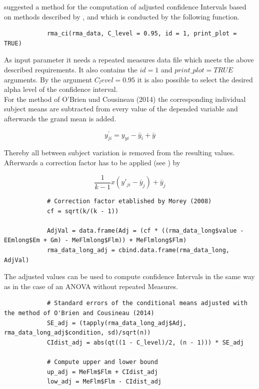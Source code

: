 \documentclass[11pt]{article}
\begin{document}
		\cite{o2014representing} suggested a method for the computation of adjusted confidence Intervals based on methods described by \cite{loftus1994using}, \cite{cousineau2005confidence} and \cite{morey2008confidence} which is conducted by the following function.\\
		
		\begin{lstlisting}
			rma_ci(rma_data, C_level = 0.95, id = 1, print_plot = TRUE)
		\end{lstlisting}
		
		As input parameter it needs a repeated measures data file which meets the above described requirements. It also contains the $id = 1$ and $print\_plot = TRUE$ arguments. By the argument $C_level = 0.95$ it is also possible to select the desired alpha level of the confidence interval.\\
		
		For the method of O'Brien und Cousineau (2014) the corresponding individual subject means are subtracted from every value of the depended variable and afterwards the grand mean is added.
		
		\begin{equation}
		y^{'}_{ji} = y_{yi} - \bar{y}_i + \bar{y}
		\end{equation}
		
		Thereby all between subject variation is removed from the resulting values. Afterwards a correction
		factor has to be applied (see \cite{morey2008confidence} ) by
		
		\begin{equation}
			\frac{1}{k-1} x (y'_{ji}-\bar{y}_j) + \bar{y}_j
		\end{equation}
		\newline
		\begin{lstlisting}
			# Correction factor etablished by Morey (2008)
			cf = sqrt(k/(k - 1))
			
			AdjVal = data.frame(Adj = (cf * ((rma_data_long$value - EEmlong$Em + Gm) - MeFlmlong$Flm)) + MeFlmlong$Flm)
			rma_data_long_adj = cbind.data.frame(rma_data_long, AdjVal)
		\end{lstlisting}
		
		The adjusted values can be used to compute confidence Intervals in the same way as in the case of
		an ANOVA without repeated Measures.\\
		
		\begin{lstlisting}
			# Standard errors of the conditional means adjusted with the method of O'Brien and Cousineau (2014)
			SE_adj = (tapply(rma_data_long_adj$Adj, rma_data_long_adj$condition, sd)/sqrt(n))
			CIdist_adj = abs(qt((1 - C_level)/2, (n - 1))) * SE_adj
			
			# Compute upper and lower bound
			up_adj = MeFlm$Flm + CIdist_adj
			low_adj = MeFlm$Flm - CIdist_adj
		\end{lstlisting}
		
\end{document}
